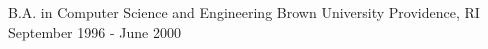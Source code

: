 

\begin{cventries}

  \cventry
    {B.A. in Computer Science and Engineering} %
    {Brown University} %
    {Providence, RI} %
    {September 1996 - June 2000} %
    {}

\end{cventries}
